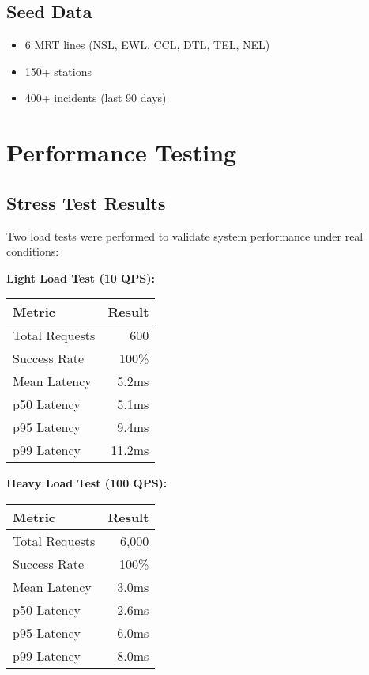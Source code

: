 \documentclass[11pt,a4paper]{article}
\begin{document}
\subsection{Seed Data}

\begin{itemize}[leftmargin=*]
    \item 6 MRT lines (NSL, EWL, CCL, DTL, TEL, NEL)
    \item 150+ stations
    \item 400+ incidents (last 90 days)
\end{itemize}

\section{Performance Testing}

\subsection{Stress Test Results}

Two load tests were performed to validate system performance under real conditions:

\textbf{Light Load Test (10 QPS):}
\begin{table}[H]
\centering
\begin{tabular}{@{}lr@{}}
\toprule
\textbf{Metric} & \textbf{Result} \\ \midrule
Total Requests & 600 \\
Success Rate & 100\% \\
Mean Latency & 5.2ms \\
p50 Latency & 5.1ms \\
p95 Latency & 9.4ms \\
p99 Latency & 11.2ms \\ \bottomrule
\end{tabular}
\end{table}

\textbf{Heavy Load Test (100 QPS):}
\begin{table}[H]
\centering
\begin{tabular}{@{}lr@{}}
\toprule
\textbf{Metric} & \textbf{Result} \\ \midrule
Total Requests & 6,000 \\
Success Rate & 100\% \\
Mean Latency & 3.0ms \\
p50 Latency & 2.6ms \\
p95 Latency & 6.0ms \\
p99 Latency & 8.0ms \\ \bottomrule
\end{tabular}
\end{table}
\end{document}
